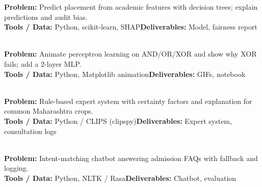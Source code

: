 \documentclass[11pt]{article}
\begin{document}
\begin{tcolorbox}[enhanced,breakable,colback=white,colframe=crimson,arc=2mm,boxrule=0.9pt,
  title={\textbf{PV.02\quad Student Placement Predictor}\hfill \colorbox{white}{\textcolor{crimson}{\scriptsize\bfseries MAJOR}}},fonttitle=\color{white},colbacktitle=crimson]
\textbf{\color{navy}Problem:} Predict placement from academic features with decision trees; explain predictions and audit bias.\\[2pt]
\textbf{\color{navy}Tools / Data:} Python, scikit-learn, SHAP\qquad \textbf{\color{navy}Deliverables:} Model, fairness report\\[2pt]
\ 
\end{tcolorbox}
\begin{tcolorbox}[enhanced,breakable,colback=white,colframe=teal,arc=2mm,boxrule=0.9pt,
  title={\textbf{PV.03\quad Perceptron Playground}\hfill \colorbox{white}{\textcolor{teal}{\scriptsize\bfseries MINI}}},fonttitle=\color{white},colbacktitle=teal]
\textbf{\color{navy}Problem:} Animate perceptron learning on AND/OR/XOR and show why XOR fails; add a 2-layer MLP.\\[2pt]
\textbf{\color{navy}Tools / Data:} Python, Matplotlib animation\qquad \textbf{\color{navy}Deliverables:} GIFs, notebook\\[2pt]
\ 
\end{tcolorbox}
\begin{tcolorbox}[enhanced,breakable,colback=white,colframe=crimson,arc=2mm,boxrule=0.9pt,
  title={\textbf{PV.04\quad Crop Disease Expert System}\hfill \colorbox{white}{\textcolor{crimson}{\scriptsize\bfseries MAJOR}}},fonttitle=\color{white},colbacktitle=crimson]
\textbf{\color{navy}Problem:} Rule-based expert system with certainty factors and explanation for common Maharashtra crops.\\[2pt]
\textbf{\color{navy}Tools / Data:} Python / CLIPS (clipspy)\qquad \textbf{\color{navy}Deliverables:} Expert system, consultation logs\\[2pt]
\ 
\end{tcolorbox}
\begin{tcolorbox}[enhanced,breakable,colback=white,colframe=crimson,arc=2mm,boxrule=0.9pt,
  title={\textbf{PV.05\quad College Admission Chatbot}\hfill \colorbox{white}{\textcolor{crimson}{\scriptsize\bfseries MAJOR}}},fonttitle=\color{white},colbacktitle=crimson]
\textbf{\color{navy}Problem:} Intent-matching chatbot answering admission FAQs with fallback and logging.\\[2pt]
\textbf{\color{navy}Tools / Data:} Python, NLTK / Rasa\qquad \textbf{\color{navy}Deliverables:} Chatbot, evaluation\\[2pt]
\ 
\end{tcolorbox}
\end{document}

